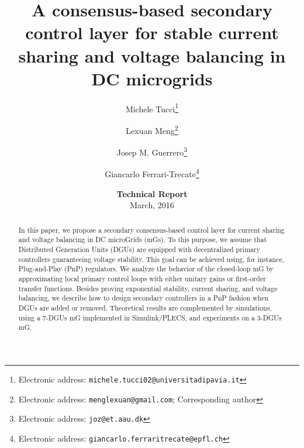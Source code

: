 \documentclass[a4paper]{article}
\theoremstyle{plain}
\begin{document}
	\title{\LARGE \bf A consensus-based secondary control layer for stable current sharing and voltage balancing in DC microgrids}
\author[1]{Michele Tucci\thanks{Electronic address:
         \texttt{michele.tucci02@universitadipavia.it}}}
        \author[2]{Lexuan Meng\thanks{Electronic address: \texttt{menglexuan@gmail.com}; Corresponding author}} 
\author[2]{Josep M. Guerrero\thanks{Electronic address: \texttt{joz@et.aau.dk}} }
\author[3]{Giancarlo Ferrari-Trecate\thanks{Electronic address: \texttt{giancarlo.ferraritrecate@epfl.ch}} }
     \date{\textbf{Technical Report}\\ March, 2016}

     \maketitle

  \begin{abstract}
  	In this paper, we propose a secondary consensus-based control
  	layer for current sharing and voltage balancing in DC microGrids
  	(mGs). To this purpose, we assume that Distributed Generation Units (DGUs) are equipped with decentralized primary controllers guaranteeing voltage stability. This goal can be achieved using, for instance, Plug-and-Play (PnP) regulators.
  	We analyze the behavior of the
  	closed-loop mG by approximating local primary control loops with
  	either unitary gains or first-order transfer functions. Besides
  	proving exponential stability, current sharing, and voltage balancing, we describe how to design secondary controllers in
  	a PnP fashion when DGUs are added or
  	removed. Theoretical results are complemented by simulations, using a 7-DGUs mG implemented in Simulink/PLECS, and experiments on a 3-DGUs mG.
  	
  \end{abstract}
  
\newpage
\end{document}
